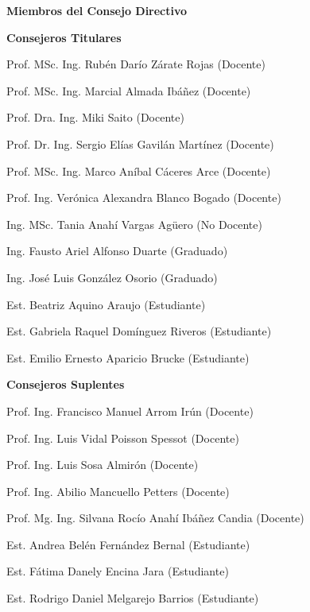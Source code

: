 \pagestyle{fancy}
\begin{center}
\textbf{Miembros del Consejo Directivo}
\end{center}
	\vspace{-5mm}
	
\begin{center}
\textbf{Consejeros Titulares}


Prof. MSc. Ing. Rubén Darío Zárate Rojas (Docente)

Prof. MSc. Ing. Marcial Almada Ibáñez (Docente)

Prof. Dra. Ing. Miki Saito (Docente)

Prof. Dr. Ing. Sergio Elías Gavilán Martínez (Docente)

Prof. MSc. Ing. Marco Aníbal Cáceres Arce (Docente) 

Prof. Ing. Verónica Alexandra Blanco Bogado (Docente)

Ing. MSc. Tania Anahí Vargas Agüero (No Docente)	

Ing. Fausto Ariel Alfonso Duarte (Graduado)

Ing. José Luis González Osorio (Graduado)

Est. Beatriz Aquino Araujo (Estudiante)

Est. Gabriela Raquel Domínguez Riveros (Estudiante)

Est. Emilio Ernesto Aparicio Brucke (Estudiante)

	\vspace{5mm}
\end{center}
 
\begin{center}
	\textbf{Consejeros Suplentes }

Prof. Ing. Francisco Manuel Arrom Irún (Docente)

Prof. Ing. Luis Vidal Poisson Spessot (Docente)

Prof. Ing. Luis Sosa Almirón (Docente)

Prof. Ing. Abilio Mancuello Petters (Docente)

Prof. Mg. Ing. Silvana Rocío Anahí Ibáñez Candia (Docente)

Est. Andrea Belén Fernández Bernal (Estudiante)

Est. Fátima Danely Encina Jara (Estudiante)

Est. Rodrigo Daniel Melgarejo Barrios (Estudiante)

\end{center}
	